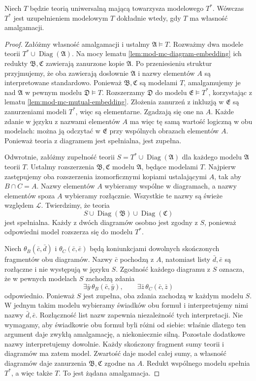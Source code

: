 \begin{twierdzenie}
\label{thm:mod-mc-completion-ap}
Niech $T$ będzie teorią uniwersalną mającą towarzysza
modelowego $T^*$. Wówczas $T^*$ jest uzupełnieniem
modelowym $T$ dokładnie wtedy, gdy $T$ ma własność
amalgamacji.
\end{twierdzenie}
\begin{proof}
Załóżmy własność amalgamacji i ustalmy
$\mathfrak A\models T$. Rozważmy dwa modele
teorii $T^*\cup\operatorname{Diag}(\mathfrak A)$.
Na mocy lematu \ref{lem:mod-mc-diagram-embedding}
ich redukty $\mathfrak B,\mathfrak C$ zawierają
zanurzone kopie $\mathfrak A$. Po przeniesieniu
struktur przyjmujemy, że oba zawierają dosłownie
$\mathfrak A$ i nazwy elementów $A$ są interpretowane
standardowo. Ponieważ $\mathfrak B,\mathfrak C$
są modelami $T$, amalgamujemy je nad $\mathfrak A$
w pewnym modelu $\mathfrak D\models T$.
Rozszerzamy $\mathfrak D$ do modelu
$\mathfrak E\models T^*$, korzystając z lematu
\ref{lem:mod-mc-mutual-embedding}.
Złożenia zanurzeń z inkluzją w $\mathfrak E$
są zanurzeniami modeli $T^*$, więc są elementarne.
Zgadzają się one na $A$.
Każde zdanie w języku z nazwami elementów $A$
ma więc tę samą wartość logiczną w obu modelach:
można ją odczytać w $\mathfrak E$ przy wspólnych
obrazach elementów $A$. Ponieważ teoria z diagramem
jest spełnialna, jest zupełna.

Odwrotnie, załóżmy zupełność teorii
$S=T^*\cup\operatorname{Diag}(\mathfrak A)$
dla każdego modelu $\mathfrak A$ teorii $T$.
Ustalmy rozszerzenia $\mathfrak B,\mathfrak C$ modelu
$\mathfrak A$, będące modelami $T$.
Najpierw zastępujemy oba rozszerzenia izomorficznymi
kopiami ustalającymi $A$, tak aby $B\cap C=A$.
Nazwy elementów $A$ wybieramy wspólne w diagramach,
a nazwy elementów spoza $A$ wybieramy rozłącznie.
Wszystkie te nazwy są świeże względem $\mathcal L$.
Twierdzimy, że teoria
\[
S\cup\operatorname{Diag}(\mathfrak B)
\cup\operatorname{Diag}(\mathfrak C)
\]
jest spełnialna. Każdy z dwóch diagramów osobno jest
zgodny z $S$, ponieważ odpowiedni model rozszerza
się do modelu $T^*$.

Niech $\theta_B(\bar c,\bar d)$ i
$\theta_C(\bar c,\bar e)$ będą koniunkcjami dowolnych
skończonych fragmentów obu diagramów. Nazwy $\bar c$
pochodzą z $A$, natomiast listy $\bar d,\bar e$
są rozłączne i nie występują w języku $S$.
Zgodność każdego diagramu z $S$ oznacza, że
w pewnych modelach $S$ zachodzą zdania
\[
\exists\bar y\,\theta_B(\bar c,\bar y),
\qquad
\exists\bar z\,\theta_C(\bar c,\bar z)
\]
odpowiednio. Ponieważ $S$ jest zupełna, oba zdania
zachodzą w każdym modelu $S$. W jednym takim modelu
wybieramy świadków obu formuł i interpretujemy nimi
nazwy $\bar d,\bar e$. Rozłączność list nazw zapewnia
niezależność tych interpretacji. Nie wymagamy,
aby świadkowie obu formuł byli różni od siebie:
właśnie dlatego ten argument daje zwykłą
amalgamację, a niekoniecznie silną. Pozostałe dodatkowe
nazwy interpretujemy dowolnie. Każdy skończony fragment
sumy teorii i diagramów ma zatem model.
Zwartość daje model całej sumy, a własność diagramów
daje zanurzenia $\mathfrak B,\mathfrak C$
zgodne na $A$. Redukt wspólnego modelu spełnia $T^*$,
a więc także $T$. To jest żądana amalgamacja.
\end{proof}

